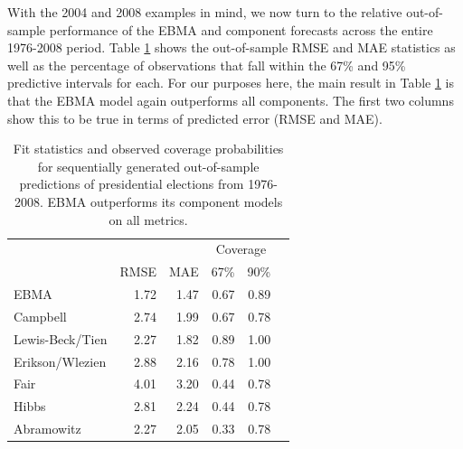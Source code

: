 \documentclass[12pt,fullpage]{article}
\begin{document}
With the 2004 and 2008 examples in mind, we now turn to the relative
out-of-sample performance of the EBMA and component forecasts across
the entire 1976-2008 period.  Table \ref{Pres-Res} shows the
out-of-sample RMSE and
MAE statistics as well as the percentage of observations that fall
within the 67\% and 95\% predictive intervals for each.  For our
purposes here, the main result in Table \ref{Pres-Res} is that the
EBMA model again outperforms all components.  The first two columns
show this to be true in terms of predicted error (RMSE and MAE).


\begin{table}[ht!]
  \caption{\footnotesize Fit statistics and observed coverage
    probabilities for sequentially generated out-of-sample predictions of
    presidential elections from 1976-2008.  EBMA outperforms its
    component models on all metrics.}
\label{Pres-Res} \small
\begin{center}
\begin{tabular}{lrrrrr}
\toprule
                        &              &              & \multicolumn{2}{c}{Coverage} \\ 
                    	&	RMSE&	MAE	&67\% &   90\%      \\
\midrule
EBMA	           &	1.72	&	1.47	&	0.67	&	0.89	\\
Campbell	           &	2.74	&	1.99	&	0.67	&	0.78	\\
Lewis-Beck/Tien&	2.27	&	1.82	&	0.89	&	1.00	\\
Erikson/Wlezien&	2.88	&	2.16	&	0.78	&	1.00	\\
Fair	                   &	4.01	&	3.20	&	0.44	&	0.78	\\
Hibbs	           &	2.81	&	2.24	&	0.44&      0.78 \\
Abramowitz	   &	2.27	&	2.05	&	0.33	&     0.78	\\

\bottomrule
\end{tabular}
\end{center}
\end{table}
\end{document}

